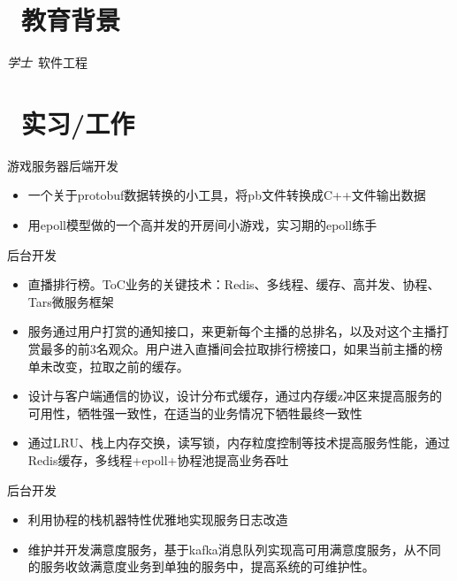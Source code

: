 \documentclass{resume}
\begin{document}


 
\section{\faGraduationCap\  教育背景}
\textit{学士}\ 软件工程

\section{\faUsers\ 实习/工作}
\role{实习}{游戏预研组员工}
游戏服务器后端开发
\begin{itemize}
  \item 一个关于protobuf数据转换的小工具，将pb文件转换成C++文件输出数据
  \item 用epoll模型做的一个高并发的开房间小游戏，实习期的epoll练手
\end{itemize}

后台开发
\begin{itemize}
  \item 直播排行榜。ToC业务的关键技术：Redis、多线程、缓存、高并发、协程、Tars微服务框架
  \item 服务通过用户打赏的通知接口，来更新每个主播的总排名，以及对这个主播打赏最多的前3名观众。用户进入直播间会拉取排行榜接口，如果当前主播的榜单未改变，拉取之前的缓存。
  \item 设计与客户端通信的协议，设计分布式缓存，通过内存缓z冲区来提高服务的可用性，牺牲强一致性，在适当的业务情况下牺牲最终一致性
  \item 通过LRU、栈上内存交换，读写锁，内存粒度控制等技术提高服务性能，通过Redis缓存，多线程+epoll+协程池提高业务吞吐
\end{itemize}

后台开发
\begin{itemize}
  \item 利用协程的栈机器特性优雅地实现服务日志改造
  \item 维护并开发满意度服务，基于kafka消息队列实现高可用满意度服务，从不同的服务收敛满意度业务到单独的服务中，提高系统的可维护性。
\end{itemize}
\end{document}
